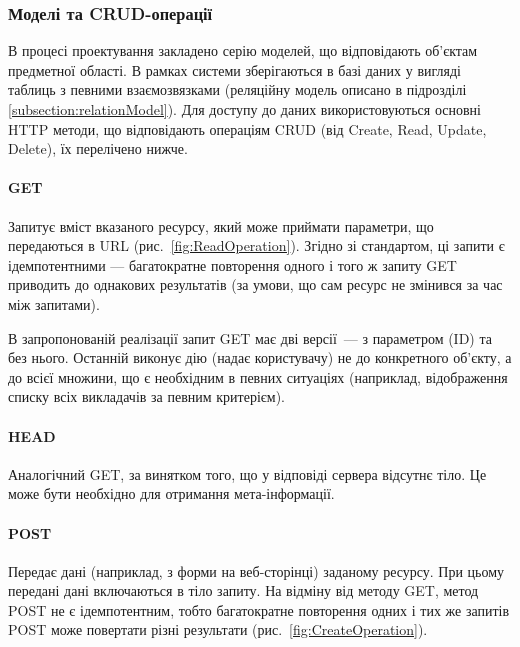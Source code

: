 \subsubsection{Моделі та CRUD-операції} \label{subs:crud}

В процесі проектування закладено серію моделей, що відповідають об’єктам предметної області. В рамках системи зберігаються в базі даних у вигляді таблиць з певними взаємозвязками (реляційну модель описано в підрозділі \ref{subsection:relationModel}). Для доступу до даних використовуються основні HTTP методи, що відповідають операціям CRUD (від Create, Read, Update, Delete), їх перелічено нижче.

\paragraph{GET}

Запитує вміст вказаного ресурсу, який може приймати параметри, що передаються в URL (рис.~\ref{fig:ReadOperation}). Згідно зі стандартом, ці запити є ідемпотентними — багатократне повторення одного і того ж запиту GET приводить до однакових результатів (за умови, що сам ресурс не змінився за час між запитами).

В запропонованій реалізації запит GET має дві версії~--- з параметром (ID) та без нього. Останній виконує дію (надає користувачу) не до конкретного об’єкту, а до всієї множини, що є необхідним в певних ситуаціях (наприклад, відображення списку всіх викладачів за певним критерієм).

\paragraph{HEAD}

Аналогічний GET, за винятком того, що у відповіді сервера відсутнє тіло. Це може бути необхідно для отримання мета-інформації.

\paragraph{POST}

Передає дані (наприклад, з форми на веб-сторінці) заданому ресурсу. При цьому передані дані включаються в тіло запиту. На відміну від методу GET, метод POST не є ідемпотентним, тобто багатократне повторення одних і тих же запитів POST може повертати різні результати (рис.~\ref{fig:CreateOperation}).

